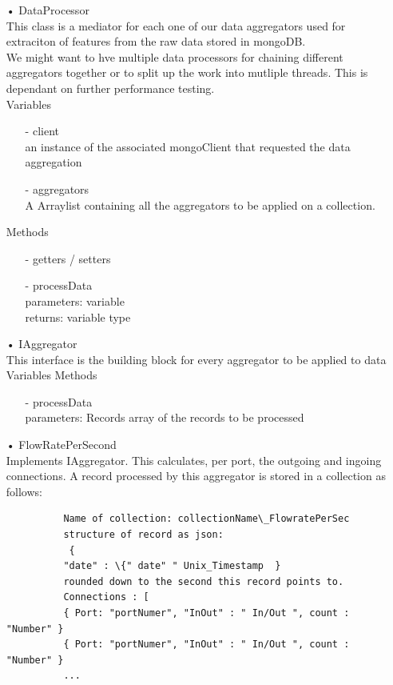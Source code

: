 \documentclass[oneside, english, final]{design}
\begin{document}
\begin{itemize}
	\item[•]DataProcessor
	\\This class is a mediator for each one of our data aggregators used for extraciton of features from the raw data stored in mongoDB.
	\\ We might want to hve multiple data processors for chaining different aggregators together or to split up the work into mutliple threads. This is dependant on further performance testing.	 
	 \\Variables
	      \begin{itemize}
		      \item[-] client
		      \\ an instance of the associated mongoClient that requested the data aggregation
		      \item[-] aggregators
		      \\ A Arraylist containing all the aggregators to be applied on a collection.
	      \end{itemize}
	      Methods
	      \begin{itemize}
		      \item[-]getters / setters
		      \item[-]processData
		       \\parameters: variable
		       \\returns: variable type
	      \end{itemize}
	\item[•] IAggregator
	\\This interface is the building block for every aggregator to be applied to data
	 \\Variables
	      Methods
	      \begin{itemize}
		      \item[-]processData
		      \\parameters: Records array of the records to be processed
	      \end{itemize}
	      
	      \item[•] FlowRatePerSecond
		  \\Implements IAggregator. This calculates, per port, the outgoing and ingoing connections.
		  A record processed by this aggregator is stored in a collection as follows:
	      \begin{verbatim} 
		  Name of collection: collectionName\_FlowratePerSec
		  structure of record as json:
		   {
		  "date" : \{" date" " Unix_Timestamp  } 
		  rounded down to the second this record points to.
		  Connections : [
		  { Port: "portNumer", "InOut" : " In/Out ", count : "Number" }
		  { Port: "portNumer", "InOut" : " In/Out ", count : "Number" }
		  ...
		  

\end{verbatim}
\end{itemize}
\end{document}

